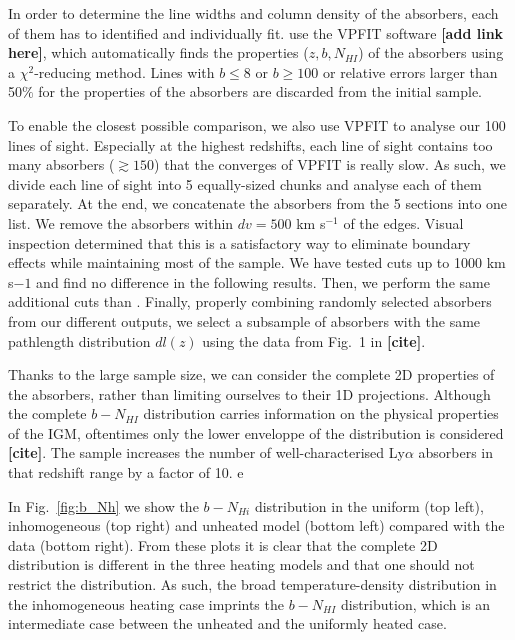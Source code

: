 \documentclass[numberedappendix]{emulateapj}
\newcommand\ALc[1]{{\color{red} \bf #1}} %
\begin{document}
In order to determine the line widths and column density of the absorbers, each of them has to identified and individually fit. \citet{2012ApJ...757L..30R} use the VPFIT software \ALc{[add link here]}, which automatically finds the properties ($z,b,N_{HI}$) of the absorbers using a $\chi^2$-reducing method. Lines with $b \leq 8$ or $b \geq 100$ or relative errors larger than 50$\%$ for the properties of the absorbers are discarded from the initial sample. 

To enable the closest possible comparison, we also use VPFIT to analyse our 100 lines of sight. Especially at the highest redshifts, each line of sight contains too many absorbers ($\gtrsim 150$) that the converges of VPFIT is really slow. As such, we divide each line of sight into 5 equally-sized chunks and analyse each of them separately. At the end, we concatenate the absorbers from the 5 sections into one list. We remove the absorbers within $dv=500$ km s$^{-1}$ of the edges. Visual inspection determined that this is a satisfactory way to eliminate boundary effects while maintaining most of the sample. We have tested cuts up to 1000 km s${-1}$ and find no difference in the following results. Then, we perform the same additional cuts than \citet{2012ApJ...757L..30R}. Finally, properly combining randomly selected absorbers from our different outputs, we select a subsample of absorbers with the same pathlength distribution $dl(z)$ using the data from Fig.~1 in \ALc{[cite]}. 

Thanks to the  large sample size, we can consider the complete 2D properties of the  absorbers, rather than limiting ourselves to their 1D projections. Although the complete $b-N_{HI}$ distribution carries information on the physical properties of the IGM, oftentimes only the lower enveloppe of the distribution is considered \ALc{[cite]}. The \citet{2012ApJ...757L..30R} sample increases the number of well-characterised Ly$\alpha$ absorbers in that redshift range by a factor of 10. e


In Fig.~\ref{fig:b_Nh} we show the $b-N_{Hi}$ distribution in the uniform (top left), inhomogeneous (top right) and unheated model (bottom left) compared with the data (bottom right). From these plots it is clear that the complete 2D distribution is different in the three heating models and that one should not restrict the distribution. As such, the broad temperature-density distribution in the inhomogeneous heating case imprints the $b-N_{HI}$ distribution, which is an intermediate case between the unheated and the uniformly heated case. 
\end{document}
